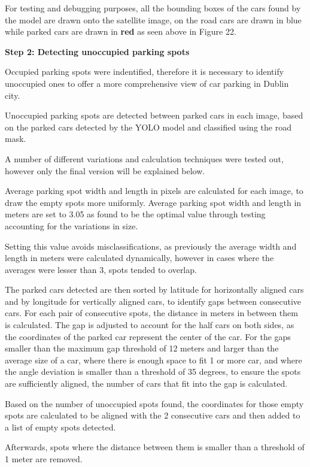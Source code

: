 For testing and debugging purposes, all the bounding boxes of the cars found by
the model are drawn onto the satellite image, on the road cars are drawn in blue
while parked cars are drawn in \textbf{red} as seen above in Figure 22.

\newpage{}

\textbf{Step 2: Detecting unoccupied parking spots}

Occupied parking spots were indentified, therefore it is necessary to
identify unoccupied ones to offer a more comprehensive view of car parking in
Dublin city.

Unoccupied parking spots are detected between parked cars in each image, based on the
parked cars detected by the YOLO model and classified using the road mask.

A number of different variations and calculation techniques were tested out,
however only the final version will be explained below.

Average parking spot width and length in pixels are calculated for each image,
to draw the empty spots more uniformly. Average parking spot width and length in
meters are set to 3.05 as found to be the optimal value through testing
accounting for the variations in size.

Setting this value avoids misclassifications, as previously the average width and
length in meters were calculated dynamically, however in cases where the
averages were lesser than 3, spots tended to overlap.

The parked cars detected are then sorted by latitude for horizontally aligned
cars and by longitude for vertically aligned cars, to identify gaps between
consecutive cars. For each pair of consecutive spots, the distance in meters in
between them is calculated. The gap is adjusted to account for the half cars on
both sides, as the coordinates of the parked car represent the center of the
car. For the gaps smaller than the maximum gap threshold of 12 meters and larger
than the average size of a car, where there is enough space to fit 1 or more
car, and where the angle deviation is smaller than a threshold of 35 degrees, to
ensure the spots are sufficiently aligned, the number of cars that fit into the
gap is calculated.

Based on the number of unoccupied spots found, the coordinates for those empty spots
are calculated to be aligned with the 2 consecutive cars and then added to a
list of empty spots detected.

Afterwards, spots where the distance between them is smaller than a threshold of
1 meter are removed.

